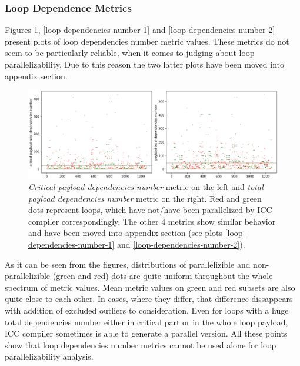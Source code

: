 \subsubsection{Loop Dependence Metrics}
\label{analysis-loop-dependence-metrics}
\qquad Figures \ref{loop-dependencies-number-0}, \ref{loop-dependencies-number-1} and \ref{loop-dependencies-number-2} present plots of loop dependencies number metric values. These metrics do not seem to be particularly reliable, when it comes to judging about loop parallelizability. Due to this reason the two latter plots have been moved into appendix section.\newline  
\begin{figure}[h]
\centering
\includegraphics[width=\linewidth]{figs/loop-dependencies-number-0.png}
\caption{\textit{Critical payload dependencies number} metric on the left and \textit{total payload dependencies number} metric on the right. Red and green dots represent loops, which have not/have been parallelized by ICC compiler correspondingly. The other 4 metrics show similar behavior and have been moved into appendix section (see plots \ref{loop-dependencies-number-1} and \ref{loop-dependencies-number-2}).}
\label{loop-dependencies-number-0}
\end{figure}
\null\qquad As it can be seen from the figures, distributions of parallelizible and non-parallelizible (green and red) dots are quite uniform throughout the whole spectrum of metric values. Mean metric values on green and red subsets are also quite close to each other. In cases, where they differ, that difference dissappears with addition of excluded outliers to consideration. Even for loops with a huge total dependencies number either in critical part or in the whole loop payload, ICC compiler sometimes is able to generate a parallel version. All these points show that loop dependencies number metrics cannot be used alone for loop parallelizability analysis.    
